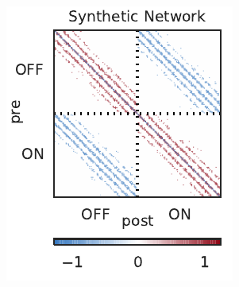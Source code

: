 \begin{figure}[t!]
  \centering
  \vspace{-.2in}
  \begin{subfigure}[b]{1.8in}
    \centering
    \caption{}
    \vspace{-.25in}
    \includegraphics[width=\textwidth]{figures/ch5/synth_rgc_true_conn.pdf}
    \label{fig:synth_rgc_true_conn}
  \end{subfigure}
  ~
  \begin{subfigure}[b]{1.8in}
    \centering
    \caption{}
    \vspace{-.25in}

\end{subfigure}
\end{figure}
